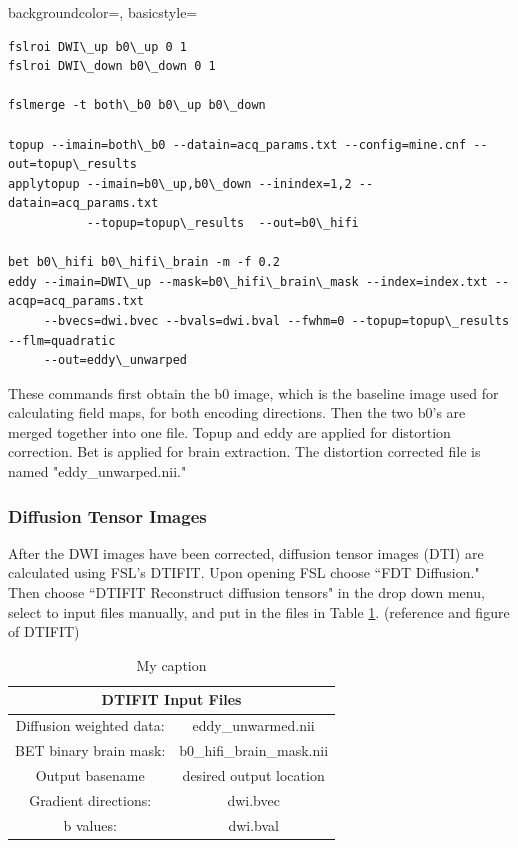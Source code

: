 {
    backgroundcolor=\color{white},
    basicstyle=\scriptsize\color{black}\ttfamily
}

\begin{lstlisting}[style=DOS]
fslroi DWI\_up b0\_up 0 1
fslroi DWI\_down b0\_down 0 1

fslmerge -t both\_b0 b0\_up b0\_down

topup --imain=both\_b0 --datain=acq_params.txt --config=mine.cnf --out=topup\_results
applytopup --imain=b0\_up,b0\_down --inindex=1,2 --datain=acq_params.txt
           --topup=topup\_results  --out=b0\_hifi

bet b0\_hifi b0\_hifi\_brain -m -f 0.2
eddy --imain=DWI\_up --mask=b0\_hifi\_brain\_mask --index=index.txt --acqp=acq_params.txt
     --bvecs=dwi.bvec --bvals=dwi.bval --fwhm=0 --topup=topup\_results --flm=quadratic
     --out=eddy\_unwarped

\end{lstlisting}

These commands first obtain the b0 image, which is the baseline image used for calculating field maps, for both encoding directions. Then the two b0's are merged together into one file. Topup and eddy are applied for distortion correction. Bet is applied for brain extraction. The distortion corrected file is named "eddy\_unwarped.nii."

\subsubsection{Diffusion Tensor Images}

After the DWI images have been corrected, diffusion tensor images (DTI) are calculated using FSL's DTIFIT. Upon opening FSL choose ``FDT Diffusion." Then choose ``DTIFIT Reconstruct diffusion tensors" in the drop down menu, select to input files manually, and put in the files in Table \ref{dtifit}. (reference and figure of DTIFIT) 

\begin{table}[H]
\centering
\caption{My caption}
\label{dtifit}
\begin{tabular}{|c|c|}
\hline
\multicolumn{2}{|c|}{DTIFIT Input Files}             \\ \hline
Diffusion weighted data: & eddy\_unwarmed.nii        \\ \hline
BET binary brain mask:   & b0\_hifi\_brain\_mask.nii \\ \hline
Output basename          & desired output location   \\ \hline
Gradient directions:     & dwi.bvec                  \\ \hline
b values:                & dwi.bval                  \\ \hline
\end{tabular}
\end{table}

